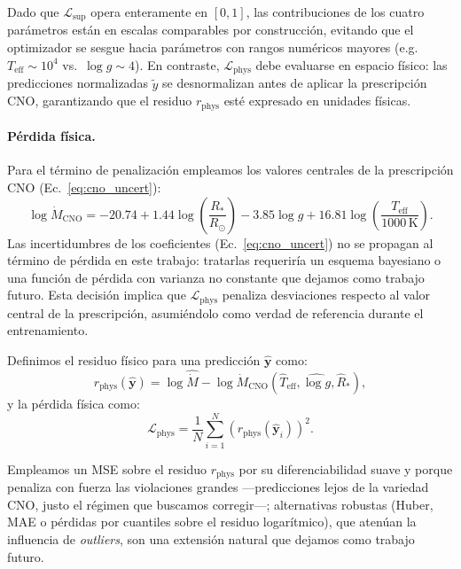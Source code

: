 \documentclass[sigconf,ACM]{acmart}
\begin{document}
Dado que $\mathcal{L}_{\mathrm{sup}}$ opera enteramente en $[0,1]$, las contribuciones de los cuatro parámetros están en escalas comparables por construcción, evitando que el optimizador se sesgue hacia parámetros con rangos numéricos mayores (e.g.\ $T_{\mathrm{eff}} \sim 10^4$ vs.\ $\log g \sim 4$). En contraste, $\mathcal{L}_{\mathrm{phys}}$ debe evaluarse en espacio físico: las predicciones normalizadas $\hat{\tilde{y}}$ se desnormalizan antes de aplicar la prescripción CNO, garantizando que el residuo $r_{\mathrm{phys}}$ esté expresado en unidades físicas.

\paragraph{Pérdida física.} Para el término de penalización empleamos los valores centrales de la prescripción CNO (Ec.~\ref{eq:cno_uncert}):
\begin{equation}
  \log \dot{M}_{\mathrm{CNO}} = -20.74 + 1.44\log\left(\frac{R_{*}}{R_\odot}\right) - 3.85\log g + 16.81\log\left(\frac{T_{\mathrm{eff}}}{1000\,\mathrm{K}}\right).
  \label{eq:cno_loss}
\end{equation}
Las incertidumbres de los coeficientes (Ec.~\ref{eq:cno_uncert}) no se propagan al término de pérdida en este trabajo: tratarlas requeriría un esquema bayesiano o una función de pérdida con varianza no constante que dejamos como trabajo futuro. Esta decisión implica que $\mathcal{L}_{\mathrm{phys}}$ penaliza desviaciones respecto al valor central de la prescripción, asumiéndolo como verdad de referencia durante el entrenamiento.

Definimos el residuo físico para una predicción $\hat{\mathbf{y}}$ como:
\begin{equation}
  r_{\mathrm{phys}}(\hat{\mathbf{y}}) = \log \hat{\dot{M}} - \log \dot{M}_{\mathrm{CNO}}(\hat{T}_{\mathrm{eff}}, \widehat{\log g}, \hat{R}_{*}),
  \label{eq:r_phys}
\end{equation}
y la pérdida física como:
\begin{equation}
  \mathcal{L}_{\mathrm{phys}} = \frac{1}{N}\sum_{i=1}^{N} \left(r_{\mathrm{phys}}(\hat{\mathbf{y}}_i)\right)^2.
  \label{eq:l_phys}
\end{equation}

Empleamos un MSE sobre el residuo $r_{\mathrm{phys}}$ por su diferenciabilidad suave y porque penaliza con fuerza las violaciones grandes ---predicciones lejos de la variedad CNO, justo el régimen que buscamos corregir---; alternativas robustas (Huber, MAE o pérdidas por cuantiles sobre el residuo logarítmico), que atenúan la influencia de \emph{outliers}, son una extensión natural que dejamos como trabajo futuro.
\end{document}
